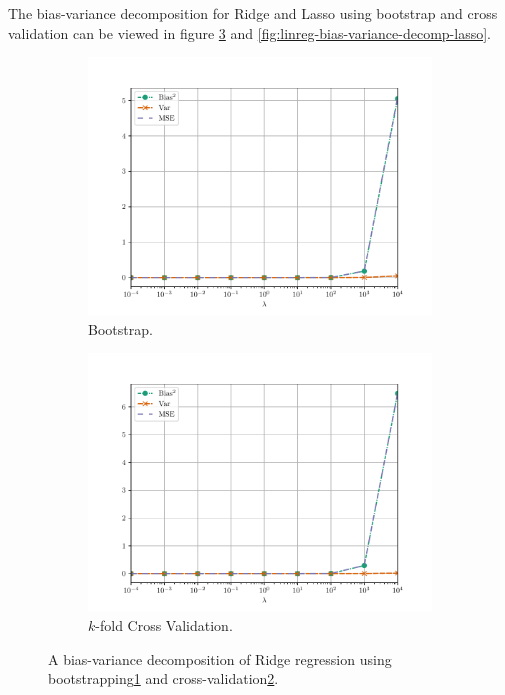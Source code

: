The bias-variance decomposition for Ridge and Lasso using bootstrap and cross validation can be viewed in figure \ref{fig:linreg-bias-variance-decomp-ridge} and \ref{fig:linreg-bias-variance-decomp-lasso}.

\begin{figure}[H]
    \centering
    \begin{subfigure}[b]{0.5\textwidth}
        \centering
        \includegraphics[scale=0.5]{../fig/ridge_bs_bias_variance_analysis.pdf}
        \caption{Bootstrap.}
        \label{fig:linreg-bias-variance-decomp-bs-ridge}
    \end{subfigure}%
    \begin{subfigure}[b]{0.5\textwidth}
        \centering
        \includegraphics[scale=0.5]{../fig/ridge_cv_bias_variance_analysis.pdf}
        \caption{$k$-fold Cross Validation.}
        \label{fig:linreg-bias-variance-decomp-cv-ridge}
    \end{subfigure}
    \caption{A bias-variance decomposition of Ridge regression using bootstrapping\ref{fig:linreg-bias-variance-decomp-bs-ridge} and cross-validation\ref{fig:linreg-bias-variance-decomp-cv-ridge}.}
    \label{fig:linreg-bias-variance-decomp-ridge}
\end{figure}

